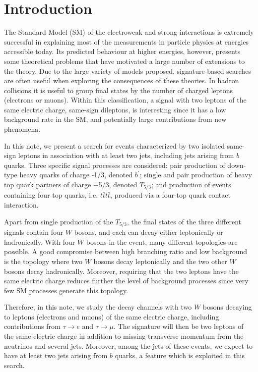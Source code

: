 
\section{Introduction}
The Standard Model (SM) of the electroweak and strong interactions is extremely successful in
explaining most of the measurements in particle physics at energies accessible today. Its
predicted behaviour at higher energies, however, presents some theoretical problems that
have motivated a large number of extensions to the theory. Due to the large
variety of models proposed, signature-based searches are often useful when exploring the
consequences of these theories. In hadron collisions it is useful to
group final states by the number of charged leptons (electrons or muons). Within this
classification, a signal with two leptons of the same electric charge, same-sign
dileptons, is interesting since it has a low background rate in the SM, and
potentially large contributions from new phenomena.

In this note, we present a search for events characterized by two isolated same-sign leptons
in association with at least two jets, including jets arising from $b$ quarks. Three specific signal
processes are considered: pair production of down-type heavy quarks of charge -1/3, denoted $b^\prime$;
single and pair production of heavy top quark partners of charge +5/3, denoted $T_{5/3}$; and
production of events containing four top quarks, i.e. $t\bar{t}t\bar{t}$, 
produced via a four-top quark contact interaction.

Apart from single production of the $T_{5/3}$, the final states of the three different
signals contain four $W$ bosons, and each can decay either leptonically or hadronically. 
With four $W$ bosons in the event, many different topologies are possible. A good compromise between
high branching ratio and low background is the topology where two $W$ bosons decay leptonically
and the two other $W$ bosons decay hadronically. Moreover, requiring that the two leptons have the same
electric charge reduces further the level of background processes since very few SM processes 
generate this topology. 

Therefore, in this note, we study the decay channels with two $W$ bosons decaying to leptons (electrons
and muons) of the same electric charge, including contributions from $\tau\rightarrow e$ and
$\tau\rightarrow\mu$. 
The signature will then be two leptons of the same electric charge in addition to missing 
transverse momentum from the neutrinos and several jets. Moreover, among the jets 
of these events, we expect to have at least two jets arising from $b$ quarks, a feature which is
exploited in this search.

